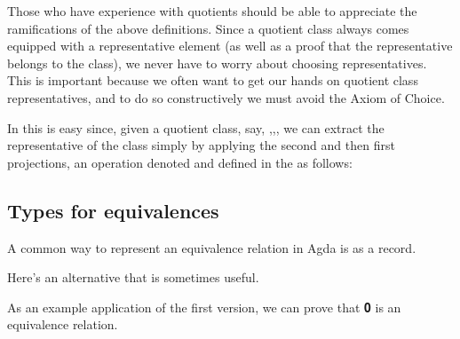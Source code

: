 \documentclass[a4paper,USenglish,cleveref,autoref,thm-restate]{lipics-v2019}
\begin{document}
Those who have experience with quotients should be able to appreciate the ramifications of the above definitions.  Since a quotient class always comes equipped with a representative element (as well as a proof that the representative belongs to the class), we never have to worry about choosing representatives. This is important because we often want to get our hands on quotient class representatives, and to do so constructively we must avoid the Axiom of Choice.

In \agdaualib this is easy since, given a quotient class, say, \AgdaSpace{}\AgdaSymbol{=}\AgdaSpace{}\AgdaSymbol{(}\AgdaSpace{}\AgdaSpace{},\AgdaSpace{}\AgdaSpace{},\AgdaSpace{}\AgdaSpace{}\AgdaSymbol{)}, we can extract the representative  of the class simply by applying the second and then first projections, an operation denoted and defined in the \agdaualib as follows:
\begin{code}\end{code}


\subsection{Types for equivalences}\label{sec:types-for-equivalences}
A common way to represent an equivalence relation in Agda is as a record.
\begin{code}\end{code}
Here's an alternative that is sometimes useful.
\begin{code}\end{code}
As an example application of the first version, we can prove that 𝟎 is an equivalence relation.
\begin{code}\end{code}
\end{document}
